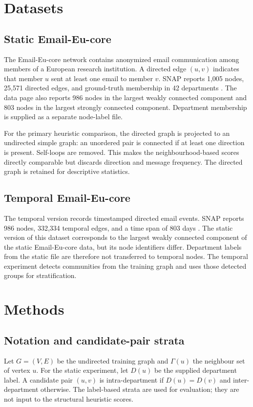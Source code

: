 \documentclass[11pt,a4paper]{article}
\begin{document}
\section{Datasets}
\subsection{Static Email-Eu-core}
The Email-Eu-core network contains anonymized email communication among members of a European research institution. A directed edge $(u,v)$ indicates that member $u$ sent at least one email to member $v$. SNAP reports 1,005 nodes, 25,571 directed edges, and ground-truth membership in 42 departments \citep{snapemail}. The data page also reports 986 nodes in the largest weakly connected component and 803 nodes in the largest strongly connected component. Department membership is supplied as a separate node-label file.

For the primary heuristic comparison, the directed graph is projected to an undirected simple graph: an unordered pair is connected if at least one direction is present. Self-loops are removed. This makes the neighbourhood-based scores directly comparable but discards direction and message frequency. The directed graph is retained for descriptive statistics.

\subsection{Temporal Email-Eu-core}
The temporal version records timestamped directed email events. SNAP reports 986 nodes, 332,334 temporal edges, and a time span of 803 days \citep{paranjape2017motifs}. The static version of this dataset corresponds to the largest weakly connected component of the static Email-Eu-core data, but its node identifiers differ. Department labels from the static file are therefore not transferred to temporal nodes. The temporal experiment detects communities from the training graph and uses those detected groups for stratification.

\section{Methods}
\subsection{Notation and candidate-pair strata}
Let $G=(V,E)$ be the undirected training graph and $\Gamma(u)$ the neighbour set of vertex $u$. For the static experiment, let $D(u)$ be the supplied department label. A candidate pair $(u,v)$ is intra-department if $D(u)=D(v)$ and inter-department otherwise. The label-based strata are used for evaluation; they are not input to the structural heuristic scores.
\end{document}
